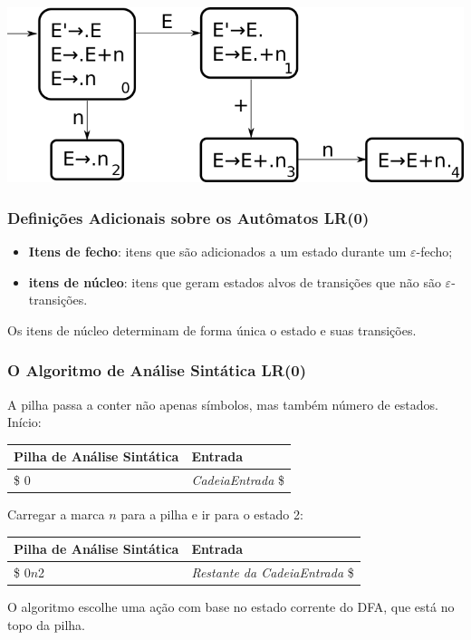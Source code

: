 \documentclass[table]{beamer}
\begin{document}
\begin{frame}
   \includegraphics[width=\linewidth,height=\textheight,keepaspectratio]{figuras/endfa.png}
\end{frame}

\begin{frame}
   \frametitle{Definições Adicionais sobre os Autômatos LR(0)}
   \begin{itemize}
      \item \textbf{Itens de fecho}: itens que são adicionados a um estado durante um $\varepsilon$-fecho;
      \item \textbf{itens de núcleo}: itens que geram estados alvos de transições que não são $\varepsilon$-transições.
   \end{itemize}
   Os itens de núcleo determinam de forma única o estado e suas transições.
\end{frame}

\begin{frame}
   \frametitle{O Algoritmo de Análise Sintática LR(0)}
   A pilha passa a conter não apenas símbolos, mas também número de estados. Início:
   \begin{table}
   \begin{tabular}{|l|l|}
   \hline
   Pilha de Análise Sintática & Entrada \\
   \hline 
   \$ 0                       & \textit{CadeiaEntrada} \$ \\
   \hline
   \end{tabular}
   \end{table}
   Carregar a marca $n$ para a pilha e ir para o estado 2:
   \begin{table}
   \begin{tabular}{|l|l|}
   \hline
   Pilha de Análise Sintática & Entrada \\
   \hline 
   \$ 0$n$2                    & \textit{Restante da CadeiaEntrada} \$ \\
   \hline
   \end{tabular}
   \end{table}
   O algoritmo escolhe uma ação com base no estado corrente do DFA, que está no topo da pilha.
\end{frame}
\end{document}
